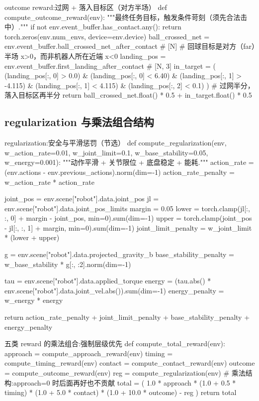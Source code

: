 \begin{codebox}[Python]{outcome reward:过网 + 落入目标区（对方半场）}
def compute_outcome_reward(env):
    """最终任务目标，触发条件苛刻（须先合法击中）."""
    if not env.event_buffer.has_contact.any():
        return torch.zeros(env.num_envs, device=env.device)
    ball_crossed_net = env.event_buffer.ball_crossed_net_after_contact   # [N]
    # 回球目标是对方（far）半场 x>0，而非机器人所在近端 x<0
    landing_pos = env.event_buffer.first_landing_after_contact           # [N, 3]
    in_target = (
        (landing_pos[:, 0] > 0.0) & (landing_pos[:, 0] < 6.40) &
        (landing_pos[:, 1] > -4.115) & (landing_pos[:, 1] < 4.115) &
        (landing_pos[:, 2] < 0.1)
    )
    # 过网半分，落入目标区再半分
    return ball_crossed_net.float() * 0.5 + in_target.float() * 0.5
\end{codebox}

\subsection{regularization 与乘法组合结构}

\begin{codebox}[Python]{regularization:安全与平滑惩罚（节选）}
def compute_regularization(env, w_action_rate=0.01, w_joint_limit=0.1,
                           w_base_stability=0.05, w_energy=0.001):
    """动作平滑 + 关节限位 + 底盘稳定 + 能耗."""
    action_rate = (env.actions - env.previous_actions).norm(dim=-1)
    action_rate_penalty = w_action_rate * action_rate

    joint_pos = env.scene["robot"].data.joint_pos
    jl = env.scene["robot"].data.joint_pos_limits
    margin = 0.05
    lower = torch.clamp(jl[:, :, 0] + margin - joint_pos, min=0).sum(dim=-1)
    upper = torch.clamp(joint_pos - jl[:, :, 1] + margin, min=0).sum(dim=-1)
    joint_limit_penalty = w_joint_limit * (lower + upper)

    g = env.scene["robot"].data.projected_gravity_b
    base_stability_penalty = w_base_stability * g[:, :2].norm(dim=-1)

    tau = env.scene["robot"].data.applied_torque
    energy = (tau.abs() * env.scene["robot"].data.joint_vel.abs()).sum(dim=-1)
    energy_penalty = w_energy * energy

    return action_rate_penalty + joint_limit_penalty + base_stability_penalty + energy_penalty
\end{codebox}

\begin{codebox}[Python]{五类 reward 的乘法组合:强制层级优先}
def compute_total_reward(env):
    approach = compute_approach_reward(env)
    timing = compute_timing_reward(env)
    contact = compute_contact_reward(env)
    outcome = compute_outcome_reward(env)
    reg = compute_regularization(env)
    # 乘法结构:approach=0 时后面再好也不贡献
    total = (
        1.0 * approach
        * (1.0 + 0.5 * timing)
        * (1.0 + 5.0 * contact)
        * (1.0 + 10.0 * outcome)
        - reg
    )
    return total
\end{codebox}

